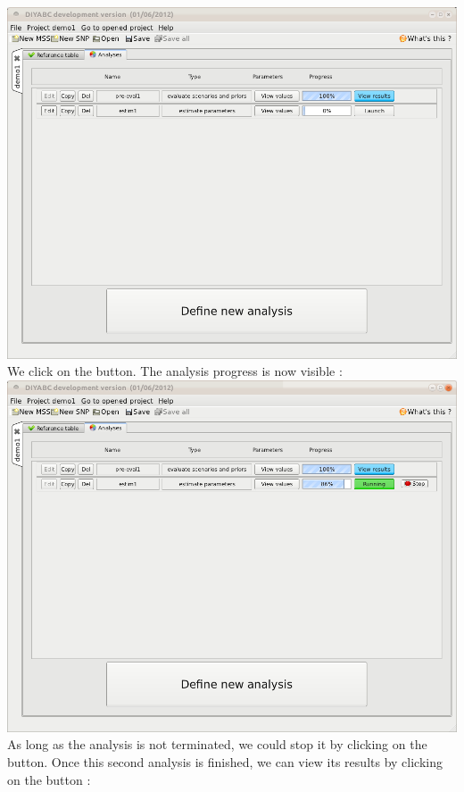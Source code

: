 \includegraphics[scale=0.35]{gui_pictures/Capture-DIYABC-38} \\


We click on the  button. The analysis progress
is now visible :\\


\includegraphics[scale=0.35]{gui_pictures/Capture-DIYABC-38a} \\


As long as the analysis is not terminated, we could stop it by clicking
on the  button. Once this second analysis is
finished, we can view its results by clicking on the  button :\\


